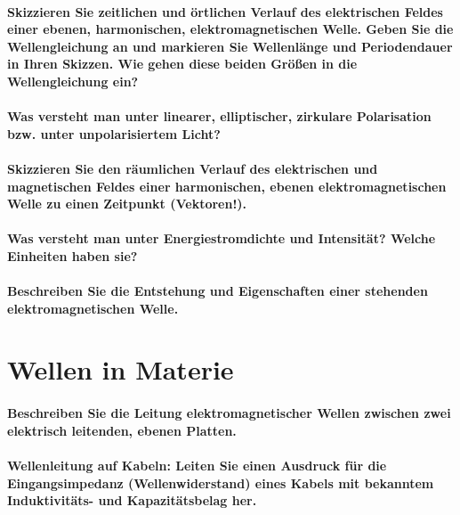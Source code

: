 \documentclass[a4paper, 11pt, parskip=half]{scrartcl}
\begin{document}
\paragraph{Skizzieren Sie zeitlichen und örtlichen Verlauf des elektrischen Feldes einer ebenen,
harmonischen, elektromagnetischen Welle. Geben Sie die Wellengleichung an und markieren Sie
Wellenlänge und Periodendauer in Ihren Skizzen. Wie gehen diese beiden Größen in die Wellengleichung
ein?}

\paragraph{Was versteht man unter linearer, elliptischer, zirkulare Polarisation bzw. unter
unpolarisiertem Licht?}

\paragraph{Skizzieren Sie den räumlichen Verlauf des elektrischen und magnetischen Feldes einer
harmonischen, ebenen elektromagnetischen Welle zu einen Zeitpunkt (Vektoren!).}

\paragraph{Was versteht man unter Energiestromdichte und Intensität? Welche Einheiten haben sie?}

\paragraph{Beschreiben Sie die Entstehung und Eigenschaften einer stehenden elektromagnetischen
Welle.}

\newpage

\section{Wellen in Materie}

\paragraph{Beschreiben Sie die Leitung elektromagnetischer Wellen zwischen zwei elektrisch
leitenden, ebenen Platten.}

\paragraph{Wellenleitung auf Kabeln: Leiten Sie einen Ausdruck für die Eingangsimpedanz
(Wellenwiderstand) eines Kabels mit bekanntem Induktivitäts- und Kapazitätsbelag her.}
\end{document}
